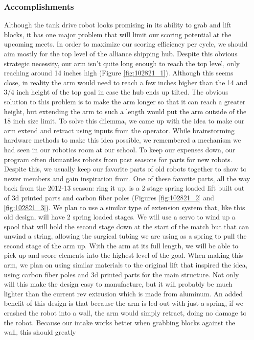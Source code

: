 \subsubsection*{Accomplishments}
Although the tank drive robot looks promising in its ability to grab and lift blocks, it has one major problem that will limit our scoring potential at the upcoming meets. In order to maximize our scoring efficiency per cycle, we should aim mostly for the top level of the alliance shipping hub. Despite this obvious strategic necessity, our arm isn’t quite long enough to reach the top level, only reaching around 14 inches high (Figure \ref{fig:102821_1}). Although this seems close, in reality the arm would need to reach a few inches higher than the 14 and 3/4 inch height of the top goal in case the hub ends up tilted. The obvious solution to this problem is to make the arm longer so that it can reach a greater height, but extending the arm to such a length would put the arm outside of the 18 inch size limit. 
To solve this dilemma, we came up with the idea to make our arm extend and retract using inputs from the operator. While brainstorming hardware methods to make this idea possible, we remembered a mechanism we had seen in our robotics room at our school. To keep our expenses down, our program often dismantles robots from past seasons for parts for new robots. Despite this, we usually keep our favorite parts of old robots together to show to newer members and gain inspiration from. One of these favorite parts, all the way back from the 2012-13 season: ring it up, is a 2 stage spring loaded lift built out of 3d printed parts and carbon fiber poles (Figures \ref{fig:102821_2} and \ref{fig:102821_3}). We plan to use a similar type of extension system that, like this old design, will have 2 spring loaded stages. We will use a servo to wind up a spool that will hold the second stage down at the start of the match but that can unwind a string, allowing the surgical tubing we are using as a spring to pull the second stage of the arm up. With the arm at its full length, we will be able to pick up and score elements into the highest level of the goal. 
When making this arm, we plan on using similar materials to the original lift that inspired the idea, using carbon fiber poles and 3d printed parts for the main structure. Not only will this make the design easy to manufacture, but it will probably be much lighter than the current rev extrusion which is made from aluminum.
An added benefit of this design is that because the arm is led out with just a spring, if we crashed the robot into a wall, the arm would simply retract, doing no damage to the robot. Because our intake works better when grabbing blocks against the wall, this should greatly 

